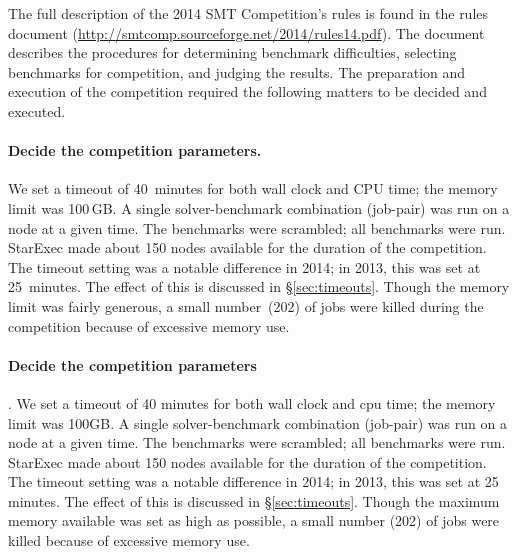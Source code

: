 \documentclass[twoside,11pt]{article}
\begin{document}
The full description of the 2014 SMT Competition's rules is found in the rules document (\url{http://smtcomp.sourceforge.net/2014/rules14.pdf}). The document describes the procedures for determining benchmark difficulties, selecting benchmarks for competition, and judging the results. The preparation and execution of the competition required the following matters to be decided and executed.

\paragraph{Decide the competition parameters.} We set a timeout of 40~minutes for both wall clock and CPU time; the memory limit was 100\,GB. A single solver-benchmark combination (job-pair) was run on a node at a given time. The benchmarks were scrambled; all benchmarks were run. StarExec made about 150 nodes available for the duration of the competition. The timeout setting was a notable difference in 2014; in 2013, this was set at 25~minutes. The effect of this is discussed in \S\ref{sec:timeouts}. Though the memory limit was fairly generous, a small number~(202) of jobs were killed during the competition because of excessive memory use.

\paragraph{Decide the competition parameters}. We set a timeout of 40 minutes for both wall clock and cpu time; the memory limit was 100GB. A single solver-benchmark combination (job-pair) was run on a node at a given time. The benchmarks were scrambled; all benchmarks were run. StarExec made about 150 nodes available for the duration of the competition. The timeout setting was a notable difference in 2014; in 2013, this was set at 25 minutes. The effect of this is discussed in \S\ref{sec:timeouts}. Though the maximum memory available was set as high as possible, a small number (202) of jobs were killed because of excessive memory use.
\end{document}
